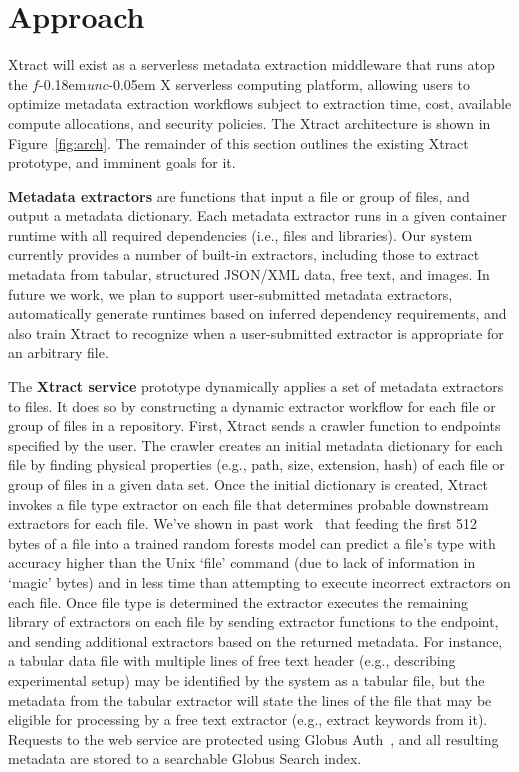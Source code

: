 \documentclass[sigconf, 9pt]{acmart}
\newcommand{\name}{Xtract}
\newcommand{\funcx}{$f$\kern-0.18em\emph{unc}\kern-0.05em X}
\begin{document}
\section{Approach}
\label{sec:approach}

\name{} will exist as a serverless metadata extraction middleware that runs atop the \funcx{} serverless 
computing platform, allowing users to optimize metadata extraction workflows subject to 
extraction time, cost, available compute allocations, and security policies.
The \name{} architecture is shown in Figure~\ref{fig:arch}.
The remainder 
of this section outlines the existing \name{} prototype, and imminent goals for it. 

\textbf{Metadata extractors} are functions that input a file or group of files, and output a metadata dictionary. 
Each metadata extractor runs in a given container runtime with all required dependencies (i.e., files and 
libraries).  Our system currently provides a number of built-in extractors, including
those to extract metadata from tabular, structured JSON/XML data, free text, and images. In future we work, 
we plan to support user-submitted metadata extractors, automatically generate runtimes based on inferred 
dependency requirements, and also train \name{} to recognize when a user-submitted extractor 
is appropriate for an arbitrary file. 

The \textbf{\name{} service} prototype dynamically applies a set of metadata extractors to files. 
It does so by constructing a dynamic extractor workflow for each file 
or group of files in a repository.  
First, \name{} sends a crawler function to endpoints specified by the user.  The crawler creates an 
initial metadata dictionary for each file by finding physical properties (e.g., path, size, extension, hash) of each file or group of files
in a given data set.  Once the initial dictionary is created, \name{} invokes a file type extractor on each file that determines probable downstream extractors for each file. We've shown in past work~\cite{skluzacek2018skluma} that feeding the first 512 bytes of a file into 
a trained random forests model can predict a file's type with accuracy higher than the Unix `file' command (due to lack of information in `magic' bytes) and in less time
than attempting to execute incorrect extractors on each file. Once file type is determined the extractor executes the remaining library of extractors 
on each file by sending extractor functions to the endpoint, and sending additional extractors based on the returned metadata.  For instance, 
a tabular data file with multiple lines of free text header (e.g., describing experimental setup) may be identified by the system as a tabular file, but 
the metadata from the tabular 
extractor will state the lines of the file that may be eligible for processing by a free text extractor (e.g., extract keywords from it).
Requests to the web service are protected using Globus Auth~\cite{tuecke2016globus}, and all resulting metadata are stored to a searchable Globus Search index. 
\end{document}
